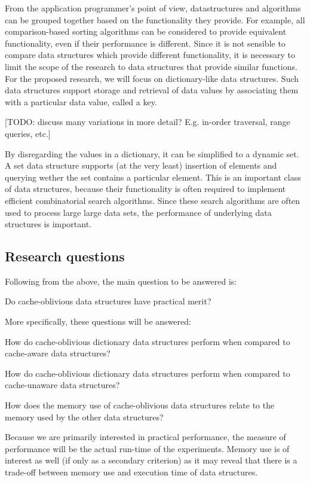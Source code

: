\documentclass{acm_proc_article-sp}
\begin{document}
From the application programmer's point of view, datastructures and algorithms can be grouped together based on the functionality they provide. For example, all comparison-based sorting algorithms can be considered to provide equivalent functionality, even if their performance is different. Since it is not sensible to compare data structures which provide different functionality, it is necessary to limit the scope of the research to data structures that provide similar functions. For the proposed research, we will focus on dictionary-like data structures. Such data structures support storage and retrieval of data values by associating them with a particular data value, called a key.

[TODO: discuss many variations in more detail? E.g. in-order traversal, range queries, etc.]

By disregarding the values in a dictionary, it can be simplified to a dynamic set. A set data structure supports (at the very least) insertion of elements and querying wether the set contains a particular element. This is an important class of data structures, because their functionality is often required to implement efficient combinatorial search algorithms. Since these search algorithms are often used to process large large data sets, the performance of underlying data structures is important.

\subsection{Research questions}
Following from the above, the main question to be answered is:
\begin{list}{}{}
\item Do cache-oblivious data structures have practical merit?
\end{list}

More specifically, these questions will be answered:
\begin{list}{.}{}
\item How do cache-oblivious dictionary data structures perform when compared to cache-aware data structures?
\item How do cache-oblivious dictionary data structures perform when compared to cache-unaware data structures?
\item How does the memory use of cache-oblivious data structures relate to the memory used by the other data structures?
\end{list}
Because we are primarily interested in practical performance, the measure of performance will be the actual run-time of the experiments. Memory use is of interest as well (if only as a secondary criterion) as it may reveal that there is a trade-off between memory use and execution time of data structures.
\end{document}
